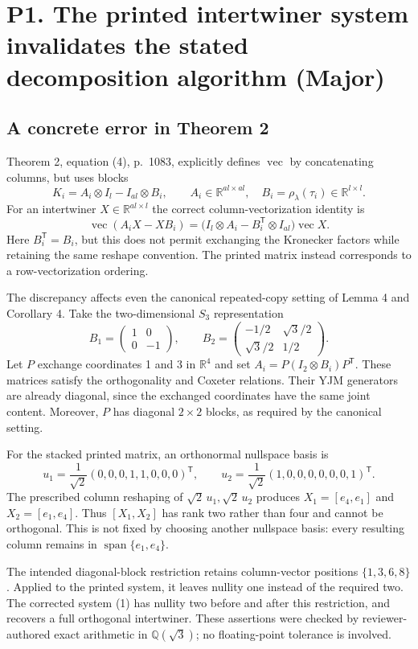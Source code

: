 \documentclass[10pt]{article}
\begin{document}
\section*{P1. The printed intertwiner system invalidates the stated decomposition algorithm (Major)}
\subsection*{A concrete error in Theorem 2}
Theorem 2, equation (4), p. 1083, explicitly defines \(\operatorname{vec}\) by concatenating columns, but uses blocks \[K_i=A_i\otimes I_l-I_{al}\otimes B_i,
 \qquad A_i\in\mathbb R^{al\times al},\quad B_i=\rho_\lambda(\tau_i)\in\mathbb R^{l\times l}.\] For an intertwiner \(X\in\mathbb R^{al\times l}\) the correct column-vectorization identity is \[\operatorname{vec}(A_iX-XB_i)
   =\bigl(I_l\otimes A_i-B_i^{\mathsf T}\otimes I_{al}\bigr)\operatorname{vec}X.
 \tag{1}\] Here \(B_i^{\mathsf T}=B_i\), but this does not permit exchanging the Kronecker factors while retaining the same reshape convention. The printed matrix instead corresponds to a row-vectorization ordering.\par
The discrepancy affects even the canonical repeated-copy setting of Lemma 4 and Corollary 4. Take the two-dimensional \(S_3\) representation \[B_1=\begin{pmatrix}1&0\\0&-1\end{pmatrix},
 \qquad
 B_2=\begin{pmatrix}-1/2&\sqrt3/2\\ \sqrt3/2&1/2\end{pmatrix}.\] Let \(P\) exchange coordinates 1 and 3 in \(\mathbb R^4\) and set \(A_i=P(I_2\otimes B_i)P^{\mathsf T}\). These matrices satisfy the orthogonality and Coxeter relations. Their YJM generators are already diagonal, since the exchanged coordinates have the same joint content. Moreover, \(P\) has diagonal \(2\times2\) blocks, as required by the canonical setting.\par
For the stacked printed matrix, an orthonormal nullspace basis is \[u_1=\frac1{\sqrt2}(0,0,0,1,1,0,0,0)^{\mathsf T},
 \qquad
 u_2=\frac1{\sqrt2}(1,0,0,0,0,0,0,1)^{\mathsf T}.\] The prescribed column reshaping of \(\sqrt2\,u_1,\sqrt2\,u_2\) produces \(X_1=[e_4,e_1]\) and \(X_2=[e_1,e_4]\). Thus \([X_1,X_2]\) has rank two rather than four and cannot be orthogonal. This is not fixed by choosing another nullspace basis: every resulting column remains in \(\operatorname{span}\{e_1,e_4\}\).\par
The intended diagonal-block restriction retains column-vector positions \(\{1,3,6,8\}\). Applied to the printed system, it leaves nullity one instead of the required two. The corrected system (1) has nullity two before and after this restriction, and recovers a full orthogonal intertwiner. These assertions were checked by reviewer-authored exact arithmetic in \(\mathbb Q(\sqrt3)\); no floating-point tolerance is involved.\par
\end{document}
